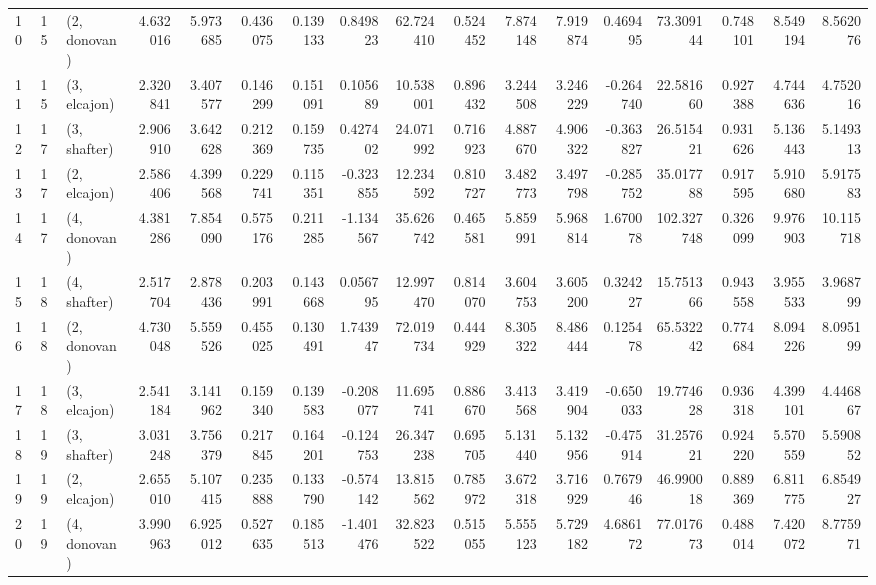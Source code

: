 \begin{tabular}{lllrrrrrrrrrrrrrr}
10 &    15 &  (2, donovan) &  4.632016 &  5.973685 &   0.436075 &  0.139133 &  0.849823 &  62.724410 &  0.524452 &   7.874148 &  7.919874 &  0.469495 &   73.309144 &  0.748101 &  8.549194 &   8.562076 \\
11 &    15 &  (3, elcajon) &  2.320841 &  3.407577 &   0.146299 &  0.151091 &  0.105689 &  10.538001 &  0.896432 &   3.244508 &  3.246229 & -0.264740 &   22.581660 &  0.927388 &  4.744636 &   4.752016 \\
12 &    17 &  (3, shafter) &  2.906910 &  3.642628 &   0.212369 &  0.159735 &  0.427402 &  24.071992 &  0.716923 &   4.887670 &  4.906322 & -0.363827 &   26.515421 &  0.931626 &  5.136443 &   5.149313 \\
13 &    17 &  (2, elcajon) &  2.586406 &  4.399568 &   0.229741 &  0.115351 & -0.323855 &  12.234592 &  0.810727 &   3.482773 &  3.497798 & -0.285752 &   35.017788 &  0.917595 &  5.910680 &   5.917583 \\
14 &    17 &  (4, donovan) &  4.381286 &  7.854090 &   0.575176 &  0.211285 & -1.134567 &  35.626742 &  0.465581 &   5.859991 &  5.968814 &  1.670078 &  102.327748 &  0.326099 &  9.976903 &  10.115718 \\
15 &    18 &  (4, shafter) &  2.517704 &  2.878436 &   0.203991 &  0.143668 &  0.056795 &  12.997470 &  0.814070 &   3.604753 &  3.605200 &  0.324227 &   15.751366 &  0.943558 &  3.955533 &   3.968799 \\
16 &    18 &  (2, donovan) &  4.730048 &  5.559526 &   0.455025 &  0.130491 &  1.743947 &  72.019734 &  0.444929 &   8.305322 &  8.486444 &  0.125478 &   65.532242 &  0.774684 &  8.094226 &   8.095199 \\
17 &    18 &  (3, elcajon) &  2.541184 &  3.141962 &   0.159340 &  0.139583 & -0.208077 &  11.695741 &  0.886670 &   3.413568 &  3.419904 & -0.650033 &   19.774628 &  0.936318 &  4.399101 &   4.446867 \\
18 &    19 &  (3, shafter) &  3.031248 &  3.756379 &   0.217845 &  0.164201 & -0.124753 &  26.347238 &  0.695705 &   5.131440 &  5.132956 & -0.475914 &   31.257621 &  0.924220 &  5.570559 &   5.590852 \\
19 &    19 &  (2, elcajon) &  2.655010 &  5.107415 &   0.235888 &  0.133790 & -0.574142 &  13.815562 &  0.785972 &   3.672318 &  3.716929 &  0.767946 &   46.990018 &  0.889369 &  6.811775 &   6.854927 \\
20 &    19 &  (4, donovan) &  3.990963 &  6.925012 &   0.527635 &  0.185513 & -1.401476 &  32.823522 &  0.515055 &   5.555123 &  5.729182 &  4.686172 &   77.017673 &  0.488014 &  7.420072 &   8.775971 \\

\end{tabular}
